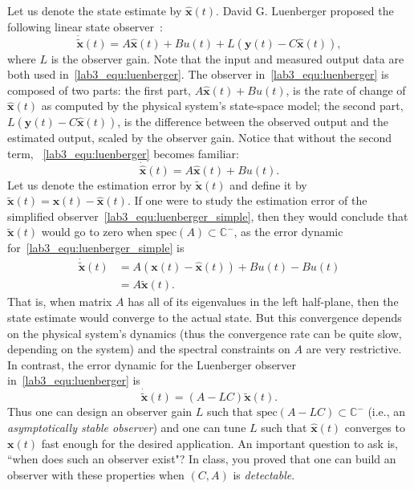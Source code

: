 \documentclass[12pt]{report}
\begin{document}
Let us denote the state estimate by $\hat{\mathbf{x}}(t)$. David G. Luenberger proposed the following linear state observer~\cite{david1971introduction}:
\begin{equation}\label{lab3_equ:luenberger}
    \mathbf{\dot{\tilde{x}}}(t)=A\hat{\mathbf{x}}(t)+Bu(t)+L(\mathbf{y}(t)-C\hat{\mathbf{x}}(t)),
\end{equation}
where $L$ is the observer gain. Note that the input and measured output data are both used in~\eqref{lab3_equ:luenberger}. The observer in~\eqref{lab3_equ:luenberger} is composed of two parts: the first part, $A\hat{\mathbf{x}}(t)+Bu(t)$, is the rate of change of $\hat{\mathbf{x}}(t)$ as computed by the physical system's state-space model; the second part, $L(\mathbf{y}(t)-C\hat{\mathbf{x}}(t))$, is the difference between the observed output and the estimated output, scaled by the observer gain. Notice that without the second term, ~\eqref{lab3_equ:luenberger} becomes familiar:
\begin{equation}\label{lab3_equ:luenberger_simple}
    \mathbf{\dot{\hat{x}}}(t)=A\hat{\mathbf{x}}(t)+Bu(t).
\end{equation}
Let us denote the estimation error by $\tilde{\mathbf{x}}(t)$ and define it by $\tilde{\mathbf{x}}(t) = \mathbf{x}(t)-\hat{\mathbf{x}}(t)$. If one were to study the estimation error of the simplified observer~\eqref{lab3_equ:luenberger_simple}, then they would conclude that $\tilde{\mathbf{x}}(t)$ would go to zero when $\text{spec}(A) \subset \mathbb{C}^-$, as the error dynamic for~\eqref{lab3_equ:luenberger_simple} is
\begin{align*}
    \mathbf{\dot{\tilde{x}}}(t) & = A \left(\mathbf{x}(t)-\hat{\mathbf{x}}(t)\right)+Bu(t) - Bu(t) \\
                                & = A\tilde{\mathbf{x}}(t).
\end{align*}
That is, when matrix $A$ has all of its eigenvalues in the left half-plane, then the state estimate would converge to the actual state. But this convergence depends on the physical system's dynamics (thus the convergence rate can be quite slow, depending on the system) and the spectral constraints on $A$ are very restrictive. In contrast, the error dynamic for the Luenberger observer in~\eqref{lab3_equ:luenberger} is
\begin{equation}\label{lab3_equ:luenberger_error}
    \mathbf{\dot{\tilde{x}}}(t) = (A-LC) \tilde{\mathbf{x}}(t).
\end{equation}
Thus one can design an observer gain $L$ such that $\text{spec}(A-LC) \subset \mathbb{C}^-$ (i.e., an \emph{asymptotically stable observer}) and one can tune $L$ such that $\hat{\mathbf{x}}(t)$ converges to $\mathbf{x}(t)$ fast enough for the desired application. An important question to ask is, ``when does such an observer exist"? In class, you proved that one can build an observer with these properties when $(C,A)$ is \emph{detectable}.
\end{document}
